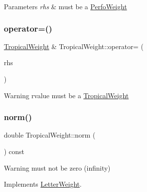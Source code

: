 \begin{DoxyParams}{Parameters}
{\em rhs} & must be a \mbox{\hyperlink{classPerfoWeight}{Perfo\+Weight}} \\
\hline
\end{DoxyParams}
\mbox{\label{group__weight_ga3aeb0d5a945daa39a0ed9a02fe92f246}} 
\subsubsection{\texorpdfstring{operator=()}{operator=()}\hspace{0.1cm}{\footnotesize\ttfamily [3/4]}}
{\footnotesize\ttfamily \mbox{\hyperlink{classTropicalWeight}{Tropical\+Weight}} \& Tropical\+Weight\+::operator= (\begin{DoxyParamCaption}\item[{const \mbox{\hyperlink{classLetterWeight}{Letter\+Weight}} \&}]{rhs }\end{DoxyParamCaption})}

\begin{DoxyWarning}{Warning}
rvalue must be a \mbox{\hyperlink{classTropicalWeight}{Tropical\+Weight}} 
\end{DoxyWarning}
\mbox{\label{group__weight_gabea8959ba2b8538194c3aadf5f9e4941}} 
\subsubsection{\texorpdfstring{norm()}{norm()}\hspace{0.1cm}{\footnotesize\ttfamily [2/3]}}
{\footnotesize\ttfamily double Tropical\+Weight\+::norm (\begin{DoxyParamCaption}{ }\end{DoxyParamCaption}) const\hspace{0.3cm}{\ttfamily [virtual]}}

\begin{DoxyWarning}{Warning}
must not be zero (infinity) 
\end{DoxyWarning}


Implements \mbox{\hyperlink{classLetterWeight}{Letter\+Weight}}.

\mbox{\label{group__weight_ga2bad107be8a2e71fc12b75196adde070}} 
